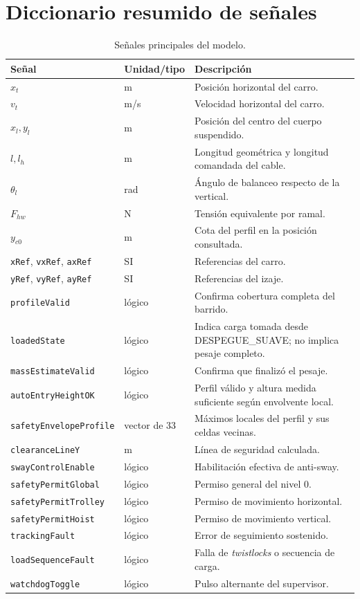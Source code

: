 \documentclass[a4paper,10pt,onecolumn,journal]{ieeeconf}
\numberwithin{equation}{section}
\renewcommand{\arraystretch}{1.35}
\begin{document}
\section{Diccionario resumido de señales}
{\small
\renewcommand{\arraystretch}{1.10}
\begin{table}[H]
\centering
\caption{Señales principales del modelo.}
\begin{tabular}{L{4.3cm} L{2.4cm} L{7.0cm}}
\toprule
Señal & Unidad/tipo & Descripción\\
\midrule
$x_t$ & m & Posición horizontal del carro.\\
$v_t$ & m/s & Velocidad horizontal del carro.\\
$x_l,y_l$ & m & Posición del centro del cuerpo suspendido.\\
$l,l_h$ & m & Longitud geométrica y longitud comandada del cable.\\
$\theta_l$ & rad & Ángulo de balanceo respecto de la vertical.\\
$F_{hw}$ & N & Tensión equivalente por ramal.\\
$y_{c0}$ & m & Cota del perfil en la posición consultada.\\
\texttt{xRef}, \texttt{vxRef}, \texttt{axRef} & SI & Referencias del carro.\\
\texttt{yRef}, \texttt{vyRef}, \texttt{ayRef} & SI & Referencias del izaje.\\
\texttt{profileValid} & lógico & Confirma cobertura completa del barrido.\\
\texttt{loadedState} & lógico & Indica carga tomada desde DESPEGUE\_SUAVE; no implica pesaje completo.\\
\texttt{massEstimateValid} & lógico & Confirma que finalizó el pesaje.\\
\texttt{autoEntryHeightOK} & lógico & Perfil válido y altura medida suficiente según envolvente local.\\
\texttt{safetyEnvelope}\newline\texttt{Profile} & vector de 33 & Máximos locales del perfil y sus celdas vecinas.\\
\texttt{clearanceLineY} & m & Línea de seguridad calculada.\\
\texttt{swayControlEnable} & lógico & Habilitación efectiva de anti-sway.\\
\texttt{safetyPermitGlobal} & lógico & Permiso general del nivel 0.\\
\texttt{safetyPermitTrolley} & lógico & Permiso de movimiento horizontal.\\
\texttt{safetyPermitHoist} & lógico & Permiso de movimiento vertical.\\
\texttt{trackingFault} & lógico & Error de seguimiento sostenido.\\
\texttt{loadSequenceFault} & lógico & Falla de \textit{twistlocks} o secuencia de carga.\\
\texttt{watchdogToggle} & lógico & Pulso alternante del supervisor.\\
\bottomrule
\end{tabular}
\end{table}
}
\end{document}
